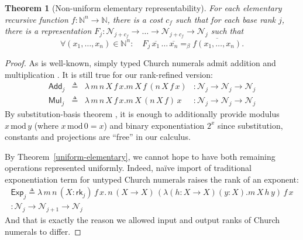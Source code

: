 \documentclass{article}
\newtheorem{theorem}{Theorem}
\theoremstyle{definition}
\theoremstyle{remark}
\begin{document}
\begin{theorem}
    [Non-uniform elementary representability]
    \label{non-uniform-rep}
    For each elementary recursive function
    $f:\mathbb{N}^n\to\mathbb{N}$, there is a
    \emph{cost} $c_f$ such that for each \emph{base
    rank} $j$, there is a \emph{representation} $F_j:
    \mathcal{N}_{j+c_f}\to\ldots\to\mathcal{N}_{j+c_f}
    \to\mathcal{N}_j$ such that
    \[
        \forall (x_1,\ldots,x_n)\in\mathbb{N}^n:\quad
        F_j\,\overline{x_1}\,\ldots\,\overline{x_n}
        =_\beta\overline{f(x_1,\ldots,x_n)}.
    \]
\end{theorem}
\begin{proof}
    As is well-known, simply typed Church numerals
    admit addition and multiplication
    \cite{church1941calculi,barendregt1984lambda}. It
    is still true for our rank-refined version:
    \[\begin{array}{rcll}
        \mathsf{Add}_j &\triangleq&
        \lambda\,m\,n\,X\,f\,x.
            m\,X\,f\,(n\,X\,f\,x) &:
            \mathcal{N}_j\to\mathcal{N}_j\to
            \mathcal{N}_j \\
        \mathsf{Mul}_j &\triangleq&
        \lambda\,m\,n\,X\,f\,x.
            m\,X\,(n\,X\,f)\,x &:
            \mathcal{N}_j\to\mathcal{N}_j\to
            \mathcal{N}_j
    \end{array}\]
    By substitution-basis theorem
    \cite{prunescu2026minimal}, it is enough
    to additionally provide modulus
    $x\,\mathrm{mod}\,y$ (where $x\,\mathrm{mod}\,0=x$)
    and binary exponentiation $2^x$ since substitution,
    constants and projections are ``free'' in our
    calculus.

    By Theorem~\ref{uniform-elementary}, we cannot hope
    to have both remaining operations represented
    uniformly. Indeed, na\"{i}ve import of traditional
    exponentiation term for untyped Church numerals
    \cite{church1941calculi,rosser1984highlights}
    raises the rank of an exponent:
    \begin{multline*}
        \mathsf{Exp}_j \triangleq
        \lambda\,m\,n\,(X:\mathsf{rk}_j)\,f\,x.\,
        n\,(X\to X)\,(\lambda (h:X\to X)(y:X).
            m\,X\,h\,y
        )\,f\,x
        \\:\mathcal{N}_j\to\mathcal{N}_{j+1}\to
        \mathcal{N}_j
    \end{multline*}
    And that is exactly the reason we allowed input and
    output ranks of Church numerals to differ.


\end{proof}
\end{document}
